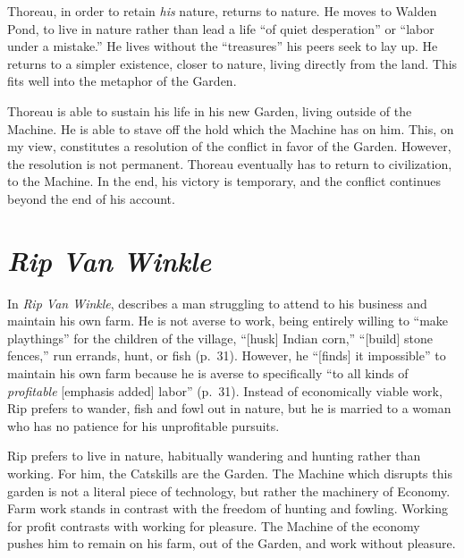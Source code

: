 \documentclass[man,12pt,natbib]{apa6}
\begin{document}
Thoreau, in order to retain \emph{his} nature, returns to nature. He moves to
Walden Pond, to live in nature rather than lead a life ``of quiet desperation''
or ``labor under a mistake.'' He lives without the ``treasures'' his peers seek
to lay up. He returns to a simpler existence, closer to nature, living directly
from the land. This fits well into the metaphor of the Garden.

Thoreau is able to sustain his life in his new Garden, living outside of the
Machine. He is able to stave off the hold which the Machine has on him. This,
on my view, constitutes a resolution of the conflict in favor of the Garden.
However, the resolution is not permanent. Thoreau eventually has to return to
civilization, to the Machine. In the end, his victory is temporary, and the
conflict continues beyond the end of his account.

\section{\emph{Rip Van Winkle}}

In \emph{Rip Van Winkle}, \citet{Irving12} describes a man struggling to attend
to his business and maintain his own farm.  He is not averse to work, being
entirely willing to ``make playthings'' for the children of the village,
``[husk] Indian corn,'' ``[build] stone fences,'' run errands, hunt, or fish
(p.~31). However, he ``[finds] it impossible'' to maintain his own farm because
he is averse to specifically ``to all kinds of \emph{profitable} [emphasis
added] labor'' (p.~31).  Instead of economically viable work, Rip prefers to
wander, fish and fowl out in nature, but he is married to a woman who has no
patience for his unprofitable pursuits.

Rip prefers to live in nature, habitually wandering and hunting rather than
working. For him, the Catskills are the Garden. The Machine which disrupts this
garden is not a literal piece of technology, but rather the machinery of
Economy. Farm work stands in contrast with the freedom of hunting and fowling.
Working for profit contrasts with working for pleasure. The Machine of the
economy pushes him to remain on his farm, out of the Garden, and work without
pleasure.
\end{document}
